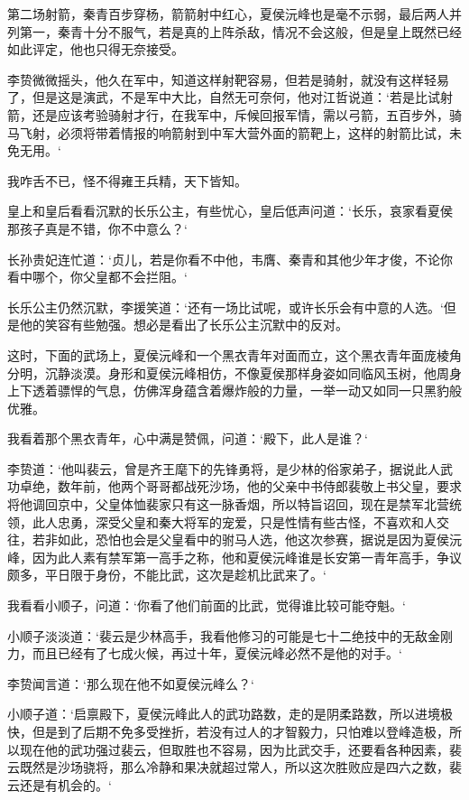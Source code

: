 第二场射箭，秦青百步穿杨，箭箭射中红心，夏侯沅峰也是毫不示弱，最后两人并列第一，秦青十分不服气，若是真的上阵杀敌，情况不会这般，但是皇上既然已经如此评定，他也只得无奈接受。

李贽微微摇头，他久在军中，知道这样射靶容易，但若是骑射，就没有这样轻易了，但是这是演武，不是军中大比，自然无可奈何，他对江哲说道：‘若是比试射箭，还是应该考验骑射才行，在我军中，斥候回报军情，需以弓箭，五百步外，骑马飞射，必须将带着情报的响箭射到中军大营外面的箭靶上，这样的射箭比试，未免无用。‘

我咋舌不已，怪不得雍王兵精，天下皆知。

皇上和皇后看看沉默的长乐公主，有些忧心，皇后低声问道：‘长乐，哀家看夏侯那孩子真是不错，你不中意么？‘

长孙贵妃连忙道：‘贞儿，若是你看不中他，韦膺、秦青和其他少年才俊，不论你看中哪个，你父皇都不会拦阻。‘

长乐公主仍然沉默，李援笑道：‘还有一场比试呢，或许长乐会有中意的人选。‘但是他的笑容有些勉强。想必是看出了长乐公主沉默中的反对。

这时，下面的武场上，夏侯沅峰和一个黑衣青年对面而立，这个黑衣青年面庞棱角分明，沉静淡漠。身形和夏侯沅峰相仿，不像夏侯那样身姿如同临风玉树，他周身上下透着骠悍的气息，仿佛浑身蕴含着爆炸般的力量，一举一动又如同一只黑豹般优雅。

我看着那个黑衣青年，心中满是赞佩，问道：‘殿下，此人是谁？‘

李贽道：‘他叫裴云，曾是齐王麾下的先锋勇将，是少林的俗家弟子，据说此人武功卓绝，数年前，他两个哥哥都战死沙场，他的父亲中书侍郎裴敬上书父皇，要求将他调回京中，父皇体恤裴家只有这一脉香烟，所以特旨诏回，现在是禁军北营统领，此人忠勇，深受父皇和秦大将军的宠爱，只是性情有些古怪，不喜欢和人交往，若非如此，恐怕也会是父皇看中的驸马人选，他这次参赛，据说是因为夏侯沅峰，因为此人素有禁军第一高手之称，他和夏侯沅峰谁是长安第一青年高手，争议颇多，平日限于身份，不能比武，这次是趁机比武来了。‘

我看看小顺子，问道：‘你看了他们前面的比武，觉得谁比较可能夺魁。‘

小顺子淡淡道：‘裴云是少林高手，我看他修习的可能是七十二绝技中的无敌金刚力，而且已经有了七成火候，再过十年，夏侯沅峰必然不是他的对手。‘

李贽闻言道：‘那么现在他不如夏侯沅峰么？‘

小顺子道：‘启禀殿下，夏侯沅峰此人的武功路数，走的是阴柔路数，所以进境极快，但是到了后期不免多受挫折，若没有过人的才智毅力，只怕难以登峰造极，所以现在他的武功强过裴云，但取胜也不容易，因为比武交手，还要看各种因素，裴云既然是沙场骁将，那么冷静和果决就超过常人，所以这次胜败应是四六之数，裴云还是有机会的。‘

